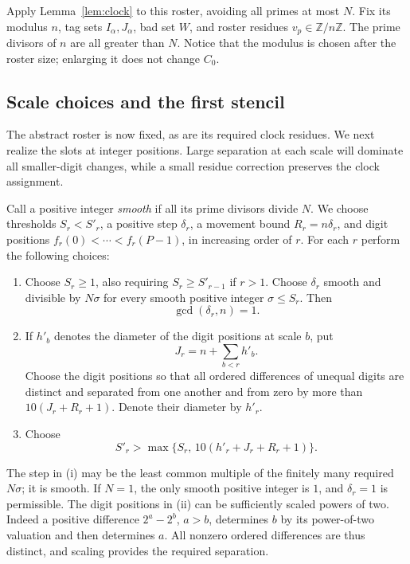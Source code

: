 Apply Lemma~\ref{lem:clock} to this roster, avoiding all primes at most
$N$.  Fix its modulus $n$, tag sets $I_\alpha,J_\alpha$, bad set $W$,
and roster residues $v_p\in\mathbb Z/n\mathbb Z$.  The prime divisors
of $n$ are all greater than $N$.  Notice that the modulus is chosen
after the roster size; enlarging it does not change $C_0$.

\subsection{Scale choices and the first stencil}

The abstract roster is now fixed, as are its required clock residues. We
next realize the slots at integer positions. Large separation at each
scale will dominate all smaller-digit changes, while a small residue
correction preserves the clock assignment.

Call a positive integer \emph{smooth} if all its prime divisors divide
$N$.  We choose thresholds $S_r<S'_r$, a positive step $\delta_r$,
a movement bound $R_r=n\delta_r$, and digit positions
$f_r(0)<\cdots<f_r(P-1)$, in increasing order of $r$.
For each $r$ perform the following choices:
\begin{enumerate}[label=(\roman*)]
\item Choose $S_r\geq1$, also requiring $S_r\geq S'_{r-1}$ if $r>1$.
Choose $\delta_r$ smooth and divisible by $N\sigma$ for every smooth
positive integer $\sigma\leq S_r$.  Then
\begin{equation}\label{eq:step-coprime}
                            \gcd(\delta_r,n)=1.
\end{equation}
\item If $h'_b$ denotes the diameter of the digit positions at scale
$b$, put
\[
                    J_r=n+\sum_{b<r}h'_b.
\]
Choose the digit positions so that all ordered differences of unequal
digits are distinct and separated from one another and from zero by
more than $10(J_r+R_r+1)$.  Denote their diameter by $h'_r$.
\item Choose
\begin{equation}\label{eq:upper-scale-threshold}
              S'_r>\max\{S_r,\,10(h'_r+J_r+R_r+1)\}.
\end{equation}
\end{enumerate}
The step in (i) may be the least common multiple of the finitely many
required $N\sigma$; it is smooth.  If $N=1$, the only smooth positive
integer is $1$, and $\delta_r=1$ is permissible.  The digit positions
in (ii) can be sufficiently scaled powers of two.  Indeed a positive
difference $2^a-2^b$, $a>b$, determines $b$ by its power-of-two
valuation and then determines $a$.  All nonzero ordered differences
are thus distinct, and scaling provides the required separation.

